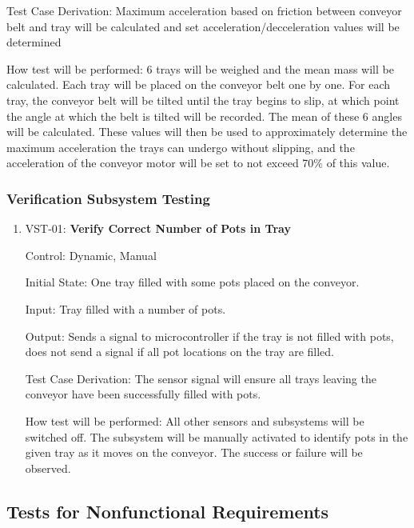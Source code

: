 \documentclass[12pt, titlepage]{article}
\begin{document}
\begin{enumerate}
Test Case Derivation: Maximum acceleration based on friction between conveyor belt and tray will be calculated 
and set acceleration/decceleration values will be determined

How test will be performed: 6 trays will be weighed and the mean mass will be calculated. Each tray will be placed on 
the conveyor belt one by one. For each tray, the conveyor belt will be tilted until the tray begins to slip, at which
point the angle at which the belt is tilted will be recorded. The mean of these 6 angles will be calculated. These values
will then be used to approximately determine the maximum acceleration the trays can undergo without slipping, and the
acceleration of the conveyor motor will be set to not exceed 70\% of this value.
\\
\end{enumerate}

\subsubsection{Verification Subsystem Testing}

\begin{enumerate}
  \item{VST-01: \textbf{Verify Correct Number of Pots in Tray}}
  
  Control: Dynamic, Manual
            
  Initial State: One tray filled with some pots placed on the conveyor.
            
  Input: Tray filled with a number of pots.
            
  Output: Sends a signal to microcontroller if the tray is not filled with pots, 
  does not send a signal if all pot locations on the tray are filled.
  
  Test Case Derivation: The sensor signal will ensure all trays leaving the conveyor 
  have been successfully filled with pots.
            
  How test will be performed: All other sensors and subsystems will be switched off. 
  The subsystem will be manually activated to identify pots in the given tray as it moves on the conveyor.
  The success or failure will be observed.\\

  
\end{enumerate}

\subsection{Tests for Nonfunctional Requirements}
\end{document}
